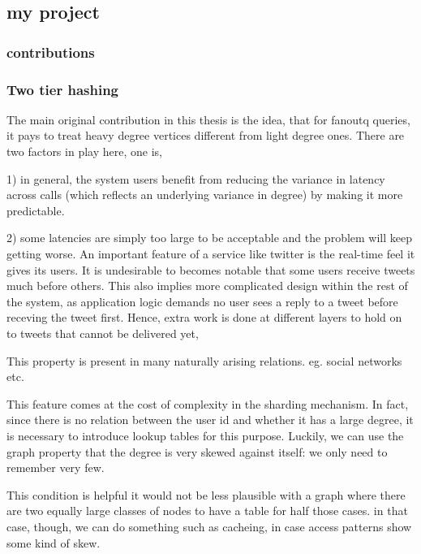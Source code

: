 \documentclass[11pt]{article}
\begin{document}

\subsection{my project}


\subsubsection{contributions}

\subsubsection{Two tier hashing}
The main original contribution in this thesis is the idea, that for fanoutq queries, it pays to treat heavy degree vertices different from light degree ones.  There are two factors in play here, one is,  

1) in general, the system users benefit from reducing the variance in latency across calls (which reflects an underlying variance in degree) by making it more predictable. 

2) some latencies are simply too large to be acceptable %
and the problem will keep getting worse.  An important feature of a service like twitter is the real-time feel it gives its users. It is undesirable to  becomes notable that some users receive tweets much before others. This also implies more complicated design within the rest of the system, as application logic demands no user sees a reply to a tweet before receving the tweet first.  Hence, extra work is done at different layers to hold on to tweets that cannot be delivered yet, 

This property is present in many naturally arising relations. eg. social networks etc.

This feature comes at the cost of complexity in the sharding mechanism. In fact, since there is no relation between the user id and whether it has a large degree, it is necessary to introduce lookup tables for this purpose. Luckily, we can use the graph property that  the degree is very skewed against itself: we only need to remember very few. 


This condition is helpful it would not be less plausible with a graph where there are two equally large classes of nodes to have a table for half those cases. in that case, though, we can do something such as cacheing, in case access patterns show some kind of skew. %
\end{document}
